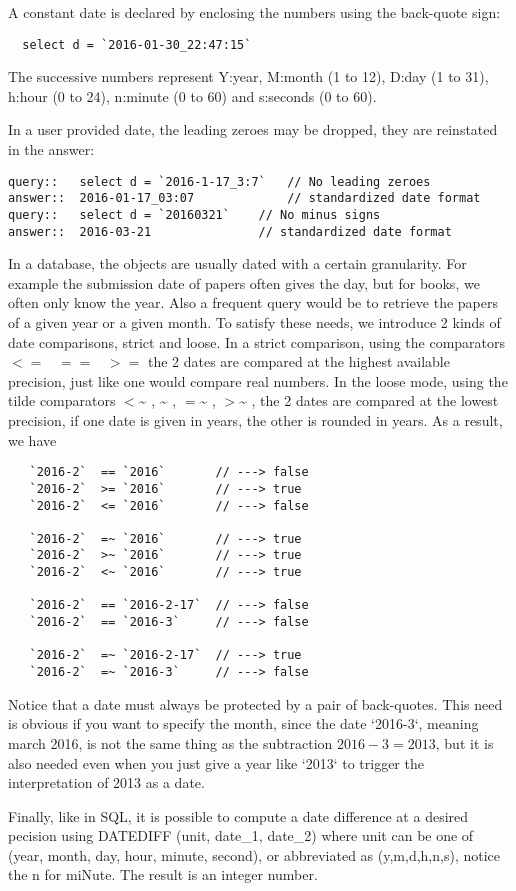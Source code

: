 \documentclass[11pt]{article}
\newcommand{\BL}{\begin{lstlisting}}
\begin{document}
A constant date is declared by enclosing the numbers using the back-quote sign:
\BL
  select d = `2016-01-30_22:47:15`
\end{lstlisting}
The successive numbers represent Y:year, M:month (1 to 12), D:day (1 to 31), h:hour (0 to 24), n:minute (0 to 60) and s:seconds (0 to 60).

In a user provided date, the leading zeroes may be dropped, they are reinstated in the answer:
\BL
query::   select d = `2016-1-17_3:7`   // No leading zeroes
answer::  2016-01-17_03:07             // standardized date format
query::   select d = `20160321`    // No minus signs
answer::  2016-03-21               // standardized date format
\end{lstlisting}

In a database, the objects are usually dated with a certain granularity. For example
the submission date of papers often gives the day, but for books, we often only know the year.
Also a frequent query would be to retrieve the papers of a  given year or a given month.
To satisfy these needs, we introduce 2 kinds of date comparisons, strict and loose.
In a strict comparison, using the comparators $<=  \;\;\;  == \;\;\;  >=$  the 2 dates
are compared at the  highest available precision, just like one would compare real numbers.
In the loose mode, using the tilde comparators $<$\~{} ,  \~{} , $=$\~{} , $>$\~{} ,  the 2 dates
are compared at the  lowest precision, if one date is given in years, the
other is rounded in years. As a result, we have
\BL
   `2016-2`  == `2016`       // ---> false
   `2016-2`  >= `2016`       // ---> true
   `2016-2`  <= `2016`       // ---> false

   `2016-2`  =~ `2016`       // ---> true
   `2016-2`  >~ `2016`       // ---> true
   `2016-2`  <~ `2016`       // ---> true

   `2016-2`  == `2016-2-17`  // ---> false
   `2016-2`  == `2016-3`     // ---> false

   `2016-2`  =~ `2016-2-17`  // ---> true
   `2016-2`  =~ `2016-3`     // ---> false
\end{lstlisting}

Notice that a date must always be protected by a pair of back-quotes. This need is obvious if you want to specify the month, 
since the date `2016-3`, meaning march 2016, is not the same thing as the subtraction $ 2016 - 3 = 2013$,
but it is also needed even when you just give a year like `2013` to trigger the interpretation
of 2013 as a date.

Finally, like in SQL, it is possible to compute a date difference at a desired pecision using
DATEDIFF (unit, date\_1, date\_2) where unit can be one of
(year, month, day, hour, minute, second), or abbreviated as (y,m,d,h,n,s),
notice the n for miNute. The result is an integer number.
\end{document}
